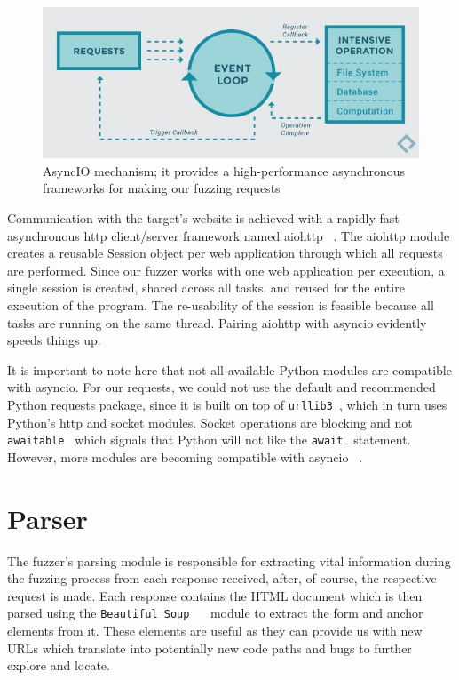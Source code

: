 \begin{figure}[ht]
 \centering
 \captionsetup{justification=centering}
 \includegraphics[width=\linewidth]{figures/asyncio_process.jpg}
 \caption[AsyncIO mechanism]
 {AsyncIO mechanism; it provides a high-performance asynchronous frameworks for making our fuzzing requests ~\cite{asyncio_image_source}}
 \label{fig:asyncio_image_source}
\end{figure}

Communication with the target's website is achieved with a rapidly fast asynchronous http client/server framework named aiohttp ~\cite{aiohttp}. The aiohttp module creates a reusable Session object per web application through which all requests are performed. Since our fuzzer works with one web application per execution, a single session is created, shared across all tasks, and reused for the entire execution of the program. The re-usability of the session is feasible because all tasks are running on the same thread. Pairing aiohttp with asyncio evidently speeds things up.

It is important to note here that not all available Python modules are compatible with asyncio. For our requests, we could not use the default and recommended Python requests package, since it is built on top of {\tt urllib3 }, which in turn uses Python's http and socket modules. Socket operations are blocking and not  {\tt awaitable } which signals that Python will not like the {\tt await } statement. However, more modules are becoming compatible with asyncio ~\cite{aiohttp}.

\section{Parser}
The fuzzer's parsing module is responsible for extracting vital information during the fuzzing process from each response received, after, of course, the respective request is made. Each response contains the HTML document which is then parsed using the {\tt  Beautiful Soup } ~\cite{beautiful_soup} module to extract the form and anchor elements from it. These elements are useful as they can provide us with new URLs which translate into potentially new code paths and bugs to further explore and locate. 

